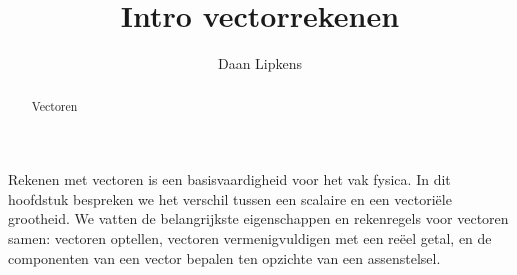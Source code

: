 \documentclass{ximera}
\title{Intro vectorrekenen}
\author{Daan Lipkens}
\begin{document}
\begin{abstract}
    Vectoren
\end{abstract}
\maketitle
\label{h:vec}

Rekenen met vectoren is een basisvaardigheid voor het vak fysica. In dit hoofdstuk bespreken we het verschil tussen een scalaire en een vectoriële grootheid. We vatten de belangrijkste eigenschappen en rekenregels voor vectoren samen: vectoren optellen, vectoren vermenigvuldigen met een reëel getal, en de componenten van een vector bepalen ten opzichte van een assenstelsel.
\end{document}
